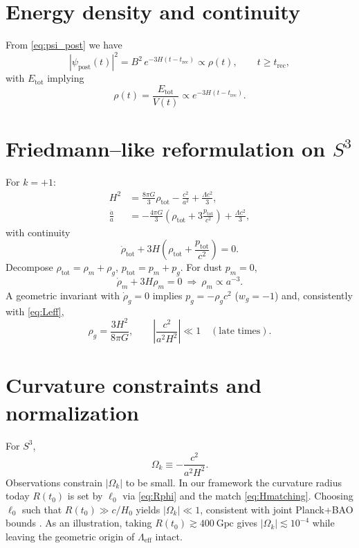 \documentclass[aps,prd,twocolumn,superscriptaddress,preprintnumbers,amsmath,amssymb,floatfix]{revtex4-2}
\newcommand{\Sthree}{S^{3}}
\newcommand{\Hnow}{H_0}
\newcommand{\Omk}{\Omega_k}
\newcommand{\Lgeff}{\Lambda_{\mathrm{eff}}}
\newcommand{\Rec}{t_{\mathrm{rec}}}
\newcommand{\tnow}{t_{0}} %
\begin{document}
\section{Energy density and continuity}\label{sec:energy}
From \eqref{eq:psi_post} we have
\begin{equation}
|\psi_{\mathrm{post}}(t)|^2 = B^2\,e^{-3H(t-\Rec)}\propto \rho(t),\qquad t\ge \Rec ,
\end{equation}
with $E_{\mathrm{tot}}$ implying
\begin{equation}
\rho(t)=\frac{E_{\mathrm{tot}}}{V(t)}\propto e^{-3H(t-\Rec)} .
\end{equation}

\section{Friedmann--like reformulation on $\Sthree$}\label{sec:friedmann}
For $k=+1$:
\begin{subequations}
\begin{align}
H^2 &= \frac{8\pi G}{3}\rho_{\mathrm{tot}} - \frac{c^2}{a^2} + \frac{\Lambda c^2}{3},\\
\frac{\ddot{a}}{a} &= -\frac{4\pi G}{3}\!\left(\rho_{\mathrm{tot}}+3\frac{p_{\mathrm{tot}}}{c^2}\right) + \frac{\Lambda c^2}{3},
\end{align}
\end{subequations}
with continuity
\begin{equation}
\dot{\rho}_{\mathrm{tot}} + 3H\!\left(\rho_{\mathrm{tot}}+\frac{p_{\mathrm{tot}}}{c^2}\right)=0 .
\end{equation}
Decompose $\rho_{\mathrm{tot}}=\rho_m+\rho_g$, $p_{\mathrm{tot}}=p_m+p_g$. For dust $p_m=0$,
\begin{equation}
\dot{\rho}_m+3H\rho_m=0 \ \Rightarrow\ \rho_m\propto a^{-3}.
\end{equation}
A geometric invariant with $\dot{\rho}_g=0$ implies $p_g=-\rho_g c^2$ ($w_g=-1$) and, consistently with \eqref{eq:Leff},
\begin{equation}
\rho_g=\frac{3H^2}{8\pi G},\qquad \left|\frac{c^2}{a^2 H^2}\right|\ll 1 \quad (\text{late times}).
\end{equation}

\section{Curvature constraints and normalization}\label{sec:curvature}
For $\Sthree$,
\begin{equation}
\Omk\equiv -\frac{c^2}{a^2 H^2}.
\end{equation}
Observations constrain $|\Omk|$ to be small. In our framework the curvature radius today $R(\tnow)$ is set by $\ell_0$ via \eqref{eq:Rphi} and the match \eqref{eq:Hmatching}. Choosing $\ell_0$ such that $R(\tnow)\gg c/\Hnow$ yields $|\Omk|\ll 1$, consistent with joint Planck+BAO bounds \cite{Planck2018,DESI2024}. As an illustration, taking $R(\tnow)\gtrsim 400~\mathrm{Gpc}$ gives $|\Omk| \lesssim 10^{-4}$ while leaving the geometric origin of $\Lgeff$ intact.
\end{document}
